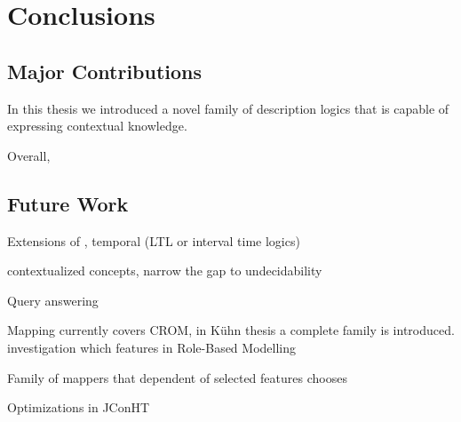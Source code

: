 \chapter{Conclusions}
\label{cha:conclusions}


\section{Major Contributions}
\label{sec:major-contributions}
 
In this thesis we introduced a novel family of description logics that is capable of expressing
contextual knowledge.



Overall, 

\section{Future Work}
\label{sec:future-work}

Extensions of \LMLO, temporal (LTL or interval time logics)

contextualized concepts, narrow the gap to undecidability

Query answering

\vspace*{3cm}

Mapping currently covers CROM, in Kühn thesis a complete family is introduced. investigation which
features in Role-Based Modelling 

Family of mappers that dependent of selected features chooses

\vspace*{3cm}

Optimizations in JConHT





